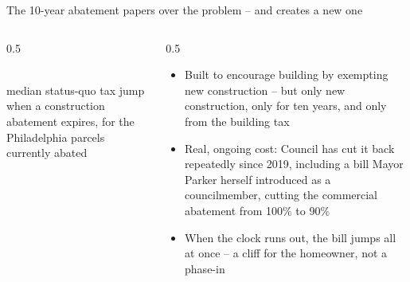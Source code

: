 \documentclass[aspectratio=169,11pt]{beamer}
\begin{document}
\begin{frame}{The 10-year abatement papers over the problem -- and creates a new one} %
\begin{columns}[T]
\begin{column}{0.5\linewidth}
\vspace{0.6em}
\begin{center}
\deckbignum{\PhlAbatementCliffMedian}\\[0.3em]
{\small\color{deckmuted} median status-quo tax jump when a construction abatement expires, for the \PhlAbatedParcelCount{} Philadelphia parcels currently abated}
\end{center}
\end{column}
\begin{column}{0.5\linewidth}
\vspace{1.0em}
\begin{itemize}
\item Built to encourage building by exempting new construction -- but only new construction, only for ten years, and only from the building tax
\item Real, ongoing cost: Council has cut it back repeatedly since 2019, including a bill Mayor Parker herself introduced as a councilmember, cutting the commercial abatement from 100\% to 90\%  %
\item When the clock runs out, the bill jumps all at once -- a cliff for the homeowner, not a phase-in
\end{itemize}
\end{column}
\end{columns}
\end{frame}
\end{document}
